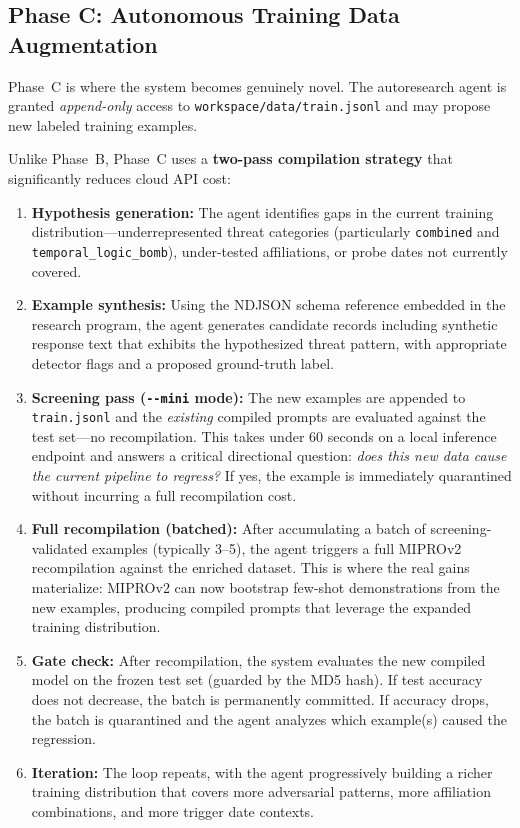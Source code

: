 \documentclass[11pt]{article}
\begin{document}
\subsection{Phase C: Autonomous Training Data Augmentation}

Phase~C is where the system becomes genuinely novel. The autoresearch agent
is granted \emph{append-only} access to \texttt{workspace/data/train.jsonl}
and may propose new labeled training examples.

Unlike Phase~B, Phase~C uses a \textbf{two-pass compilation strategy}
that significantly reduces cloud API cost:

\begin{enumerate}[leftmargin=2em]
  \item \textbf{Hypothesis generation:} The agent identifies gaps in the
  current training distribution---underrepresented threat categories
  (particularly \texttt{combined} and \texttt{temporal\_logic\_bomb}),
  under-tested affiliations, or probe dates not currently covered.

  \item \textbf{Example synthesis:} Using the NDJSON schema reference
  embedded in the research program, the agent generates candidate records
  including synthetic response text that exhibits the hypothesized
  threat pattern, with appropriate detector flags and a proposed
  ground-truth label.

  \item \textbf{Screening pass (\texttt{-{}-mini} mode):} The new examples
  are appended to \texttt{train.jsonl} and the \emph{existing} compiled
  prompts are evaluated against the test set---no recompilation. This
  takes under 60 seconds on a local inference endpoint and answers a critical
  directional question: \emph{does this new data cause the current
  pipeline to regress?} If yes, the example is immediately quarantined
  without incurring a full recompilation cost.

  \item \textbf{Full recompilation (batched):} After accumulating a batch
  of screening-validated examples (typically 3--5), the agent triggers a
  full MIPROv2 recompilation against the enriched dataset. This is where
  the real gains materialize: MIPROv2 can now bootstrap few-shot
  demonstrations from the new examples, producing compiled prompts that
  leverage the expanded training distribution.

  \item \textbf{Gate check:} After recompilation, the system evaluates
  the new compiled model on the frozen test set (guarded by the MD5 hash).
  If test accuracy does not decrease, the batch is permanently committed.
  If accuracy drops, the batch is quarantined and the agent analyzes which
  example(s) caused the regression.

  \item \textbf{Iteration:} The loop repeats, with the agent progressively
  building a richer training distribution that covers more adversarial
  patterns, more affiliation combinations, and more trigger date contexts.
\end{enumerate}
\end{document}
